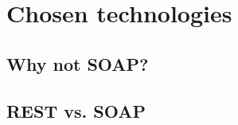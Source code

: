 \chapter{Chosen technologies}\label{technologies}

\section{Why not SOAP?}
	
\section{REST vs. SOAP}